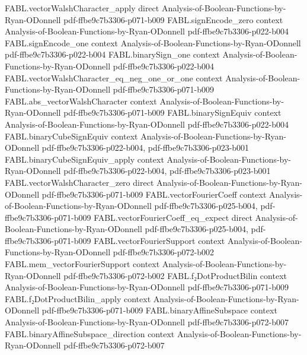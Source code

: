 \begin{theorem}
\proofstep
  {FABL.vectorWalshCharacter_apply}
  {direct}
  {Analysis-of-Boolean-Functions-by-Ryan-ODonnell}
  {pdf-ffbe9c7b3306-p071-b009}
\proofstep
  {FABL.signEncode_zero}
  {context}
  {Analysis-of-Boolean-Functions-by-Ryan-ODonnell}
  {pdf-ffbe9c7b3306-p022-b004}
\proofstep
  {FABL.signEncode_one}
  {context}
  {Analysis-of-Boolean-Functions-by-Ryan-ODonnell}
  {pdf-ffbe9c7b3306-p022-b004}
\proofstep
  {FABL.binarySign_one}
  {context}
  {Analysis-of-Boolean-Functions-by-Ryan-ODonnell}
  {pdf-ffbe9c7b3306-p022-b004}
\proofstep
  {FABL.vectorWalshCharacter_eq_neg_one_or_one}
  {context}
  {Analysis-of-Boolean-Functions-by-Ryan-ODonnell}
  {pdf-ffbe9c7b3306-p071-b009}
\proofstep
  {FABL.abs_vectorWalshCharacter}
  {context}
  {Analysis-of-Boolean-Functions-by-Ryan-ODonnell}
  {pdf-ffbe9c7b3306-p071-b009}
\proofstep
  {FABL.binarySignEquiv}
  {context}
  {Analysis-of-Boolean-Functions-by-Ryan-ODonnell}
  {pdf-ffbe9c7b3306-p022-b004}
\proofstep
  {FABL.binaryCubeSignEquiv}
  {context}
  {Analysis-of-Boolean-Functions-by-Ryan-ODonnell}
  {pdf-ffbe9c7b3306-p022-b004,
    pdf-ffbe9c7b3306-p023-b001}
\proofstep
  {FABL.binaryCubeSignEquiv_apply}
  {context}
  {Analysis-of-Boolean-Functions-by-Ryan-ODonnell}
  {pdf-ffbe9c7b3306-p022-b004,
    pdf-ffbe9c7b3306-p023-b001}
\proofstep
  {FABL.vectorWalshCharacter_zero}
  {direct}
  {Analysis-of-Boolean-Functions-by-Ryan-ODonnell}
  {pdf-ffbe9c7b3306-p071-b009}
\proofstep
  {FABL.vectorFourierCoeff}
  {context}
  {Analysis-of-Boolean-Functions-by-Ryan-ODonnell}
  {pdf-ffbe9c7b3306-p025-b004,
    pdf-ffbe9c7b3306-p071-b009}
\proofstep
  {FABL.vectorFourierCoeff_eq_expect}
  {direct}
  {Analysis-of-Boolean-Functions-by-Ryan-ODonnell}
  {pdf-ffbe9c7b3306-p025-b004,
    pdf-ffbe9c7b3306-p071-b009}
\proofstep
  {FABL.vectorFourierSupport}
  {context}
  {Analysis-of-Boolean-Functions-by-Ryan-ODonnell}
  {pdf-ffbe9c7b3306-p072-b002}
\proofstep
  {FABL.mem_vectorFourierSupport}
  {context}
  {Analysis-of-Boolean-Functions-by-Ryan-ODonnell}
  {pdf-ffbe9c7b3306-p072-b002}
\proofstep
  {FABL.f₂DotProductBilin}
  {context}
  {Analysis-of-Boolean-Functions-by-Ryan-ODonnell}
  {pdf-ffbe9c7b3306-p071-b009}
\proofstep
  {FABL.f₂DotProductBilin_apply}
  {context}
  {Analysis-of-Boolean-Functions-by-Ryan-ODonnell}
  {pdf-ffbe9c7b3306-p071-b009}
\proofstep
  {FABL.binaryAffineSubspace}
  {context}
  {Analysis-of-Boolean-Functions-by-Ryan-ODonnell}
  {pdf-ffbe9c7b3306-p072-b007}
\proofstep
  {FABL.binaryAffineSubspace_direction}
  {context}
  {Analysis-of-Boolean-Functions-by-Ryan-ODonnell}
  {pdf-ffbe9c7b3306-p072-b007}
\proofstep

\end{theorem}
